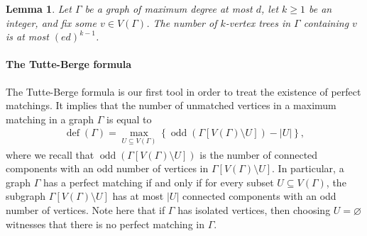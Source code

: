 \documentclass[10pt,a4paper]{article}
\newtheorem{lemma}[thm]{Lemma}
\newcommand{\defi}{\operatorname{def}}
\newcommand{\odd}{\operatorname{odd}}
\begin{document}
\begin{lemma}\label{lem:rooted-trees}
Let $\Gamma$ be a graph of maximum degree at most $d$, let $k\ge1$ be an integer, and fix some $v\in V(\Gamma)$.
The number of $k$-vertex trees in $\Gamma$ containing $v$ is at most $(ed)^{k-1}$.
\end{lemma}


\paragraph{The Tutte-Berge formula}

The Tutte-Berge formula \cite{B62} is our first tool in order to treat the existence of perfect matchings. It implies that the number of unmatched vertices in a maximum matching in a graph $\Gamma$ is equal to 
\begin{align} \label{eq:Tutte-Berge}
    \defi(\Gamma)= \max_{U\subseteq V(\Gamma)} \left\{\odd\left(\Gamma[V(\Gamma)\setminus U]\right)- |U|\right\},
\end{align}
where we recall that $\odd\left(\Gamma[V(\Gamma)\setminus U]\right)$ is the number of connected components with an odd number of vertices in $\Gamma[V(\Gamma)\setminus U]$. In particular, a graph $\Gamma$ has a perfect matching if and only if for every subset $U\subseteq V(\Gamma)$, the subgraph $\Gamma[V(\Gamma)\setminus U]$ has at most $|U|$ connected components with an odd number of vertices. Note here that if $\Gamma$ has isolated vertices, then choosing $U=\varnothing$ witnesses that there is no perfect matching in $\Gamma$.
\end{document}
